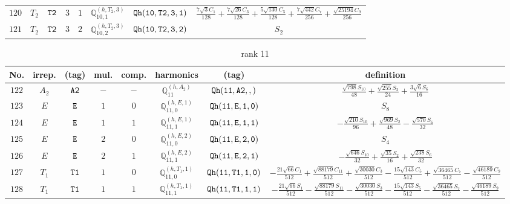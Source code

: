 \documentclass[fleqn,8pt]{jsarticle}
\begin{document}
\begin{table}[ht!]
\begin{center}
\begin{tabular}{cccccccc}
$ 120 $ & $ T_{2} $ & $ {\tt T2} $ & $ 3 $ & $ 1 $ & $ \mathbb{Q}_{10,1}^{(h,T_{2},3)} $ & $ {\tt Qh(10,T2,3,1)} $ & $ \frac{7 \sqrt{3} C_{1}}{128} + \frac{7 \sqrt{26} C_{3}}{128} + \frac{5 \sqrt{130} C_{5}}{128} + \frac{7 \sqrt{442} C_{7}}{256} + \frac{\sqrt{25194} C_{9}}{256} $ \\
$ 121 $ & $ T_{2} $ & $ {\tt T2} $ & $ 3 $ & $ 2 $ & $ \mathbb{Q}_{10,2}^{(h,T_{2},3)} $ & $ {\tt Qh(10,T2,3,2)} $ & $ S_{2} $ \\
 \hline \hline
\end{tabular}
\end{center}
\end{table}
\begin{table}[ht!]
\begin{center}
\caption{rank 11}
\renewcommand{\arraystretch}{1.3}
\begin{tabular}{cccccccc} \hline \hline
No. & irrep. & (tag) & mul. & comp. & harmonics & (tag) & definition \\ \hline
$ 122 $ & $ A_{2} $ & $ {\tt A2} $ & $ - $ & $ - $ & $ \mathbb{Q}_{11}^{(h,A_{2})} $ & $ {\tt Qh(11,A2,,)} $ & $ \frac{\sqrt{798} S_{10}}{48} + \frac{\sqrt{255} S_{2}}{24} + \frac{3 \sqrt{6} S_{6}}{16} $ \\
$ 123 $ & $ E $ & $ {\tt E} $ & $ 1 $ & $ 0 $ & $ \mathbb{Q}_{11,0}^{(h,E,1)} $ & $ {\tt Qh(11,E,1,0)} $ & $ S_{8} $ \\
$ 124 $ & $ E $ & $ {\tt E} $ & $ 1 $ & $ 1 $ & $ \mathbb{Q}_{11,1}^{(h,E,1)} $ & $ {\tt Qh(11,E,1,1)} $ & $ - \frac{\sqrt{210} S_{10}}{96} + \frac{\sqrt{969} S_{2}}{48} - \frac{\sqrt{570} S_{6}}{32} $ \\
$ 125 $ & $ E $ & $ {\tt E} $ & $ 2 $ & $ 0 $ & $ \mathbb{Q}_{11,0}^{(h,E,2)} $ & $ {\tt Qh(11,E,2,0)} $ & $ S_{4} $ \\
$ 126 $ & $ E $ & $ {\tt E} $ & $ 2 $ & $ 1 $ & $ \mathbb{Q}_{11,1}^{(h,E,2)} $ & $ {\tt Qh(11,E,2,1)} $ & $ - \frac{\sqrt{646} S_{10}}{32} + \frac{\sqrt{35} S_{2}}{16} + \frac{\sqrt{238} S_{6}}{32} $ \\
$ 127 $ & $ T_{1} $ & $ {\tt T1} $ & $ 1 $ & $ 0 $ & $ \mathbb{Q}_{11,0}^{(h,T_{1},1)} $ & $ {\tt Qh(11,T1,1,0)} $ & $ - \frac{21 \sqrt{66} C_{1}}{512} + \frac{\sqrt{88179} C_{11}}{512} + \frac{\sqrt{30030} C_{3}}{512} - \frac{15 \sqrt{143} C_{5}}{512} + \frac{\sqrt{36465} C_{7}}{512} - \frac{\sqrt{46189} C_{9}}{512} $ \\
$ 128 $ & $ T_{1} $ & $ {\tt T1} $ & $ 1 $ & $ 1 $ & $ \mathbb{Q}_{11,1}^{(h,T_{1},1)} $ & $ {\tt Qh(11,T1,1,1)} $ & $ - \frac{21 \sqrt{66} S_{1}}{512} - \frac{\sqrt{88179} S_{11}}{512} - \frac{\sqrt{30030} S_{3}}{512} - \frac{15 \sqrt{143} S_{5}}{512} - \frac{\sqrt{36465} S_{7}}{512} - \frac{\sqrt{46189} S_{9}}{512} $ \\

\end{tabular}
\end{center}
\end{table}
\end{document}

